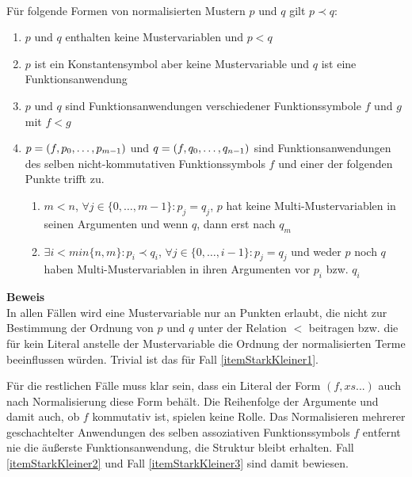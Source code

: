 \begin{lemma}~\\ \label{lemStarkKleinerFaelle}
Für folgende Formen von normalisierten Mustern $p$ und $q$ gilt $p \prec q$:
\begin{enumerate}
	\item{$p$ und $q$ enthalten keine Mustervariablen und $p < q$} \label{itemStarkKleiner1}
	
	\item{$p$ ist ein Konstantensymbol aber keine Mustervariable und $q$ ist eine Funktionsanwendung}  \label{itemStarkKleiner2}
	
	\item{$p$ und $q$ sind Funktionsanwendungen verschiedener Funktionssymbole $f$ und $g$ mit $f < g$}  \label{itemStarkKleiner3}
		
	\item{$p = (f, {p}_{0}, \dots, {p}_{m-1})$ und $q = (f, {q}_{0}, \dots, {q}_{n-1})$ sind Funktionsanwendungen des selben nicht-kommutativen Funktionssymbols $f$ und einer der folgenden Punkte trifft zu.
	\begin{enumerate}
		\item{$m < n$, $\forall j \in \{0, \dots, m-1\} \colon p_j = q_j$, $p$ hat keine Multi-Mustervariablen in seinen Argumenten und wenn $q$, dann erst nach $q_m$}
		\item{$\exists i < min\{n, m\} \colon p_i \prec q_i$, $\forall j \in \{0, \dots, i  - 1\} \colon p_j = q_j$ und weder $p$ noch $q$ haben Multi-Mustervariablen in ihren Argumenten vor $p_i$ bzw. $q_i$}
	\end{enumerate}
	} \label{itemStarkKleiner4}
	
\end{enumerate}
\end{lemma}

\textbf{Beweis}~\\
In allen Fällen wird eine Mustervariable nur an Punkten erlaubt, die nicht zur Bestimmung der Ordnung von $p$ und $q$ unter der Relation $<$ beitragen bzw. die für kein Literal anstelle der Mustervariable die Ordnung der normalisierten Terme beeinflussen würden. Trivial ist das für Fall \ref{itemStarkKleiner1}.

Für die restlichen Fälle muss klar sein, dass ein Literal der Form $(f, xs...)$ auch nach Normalisierung diese Form behält. Die Reihenfolge der Argumente und damit auch, ob $f$ kommutativ ist, spielen keine Rolle. Das Normalisieren mehrerer geschachtelter Anwendungen des selben assoziativen Funktionssymbols $f$ entfernt nie die äußerste Funktionsanwendung, die Struktur bleibt erhalten.
Fall \ref{itemStarkKleiner2} und Fall \ref{itemStarkKleiner3} sind damit bewiesen.


